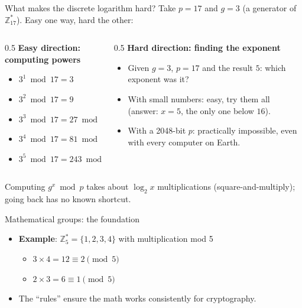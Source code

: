 \ifdefined\PRESENTATION\else\PassOptionsToClass{handout}{beamer}\fi\documentclass[aspectratio=169, lualatex]{beamer}
\begin{document}
\begin{frame}{What makes the discrete logarithm hard?}
	Take $p = 17$ and $g = 3$ (a generator of $\mathbb{Z}_{17}^*$). Easy one way, hard the other:
	\vspace{0.15cm}
	\begin{columns}[t]
		\begin{column}{0.5\textwidth}
			\textbf{Easy direction: computing powers}
			\begin{itemize}[<+->]
				\item $3^1 \bmod 17 = 3$
				\item $3^2 \bmod 17 = 9$
				\item $3^3 \bmod 17 = 27 \bmod 17 = 10$
				\item $3^4 \bmod 17 = 81 \bmod 17 = 13$
				\item $3^5 \bmod 17 = 243 \bmod 17 = 5$
			\end{itemize}
		\end{column}
		\begin{column}{0.5\textwidth}
			\textbf{Hard direction: finding the exponent}
			\begin{itemize}[<+->]
				\item Given $g = 3$, $p = 17$ and the result $5$: which exponent was it?
				\item With small numbers: easy, try them all (answer: $x = 5$, the only one below $16$).
				\item With a 2048-bit $p$: practically impossible, even with every computer on Earth.
			\end{itemize}
		\end{column}
	\end{columns}
	\vspace{0.2cm}
	\pause
	Computing $g^x \bmod p$ takes about $\log_2 x$ multiplications (square-and-multiply); going back has no known shortcut.
\end{frame}

\begin{frame}{Mathematical groups: the foundation}
	\begin{itemize}[<+->]
		\item \textbf{Example}: $\mathbb{Z}_5^* = \{1, 2, 3, 4\}$ with multiplication mod 5
		      \begin{itemize}
			      \item $3 \times 4 = 12 \equiv 2 \pmod{5}$
			      \item $2 \times 3 = 6 \equiv 1 \pmod{5}$
		      \end{itemize}
		\item The ``rules'' ensure the math works consistently for cryptography.
	\end{itemize}
\end{frame}
\end{document}
